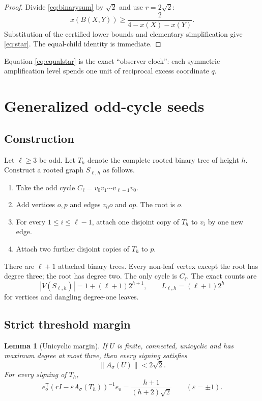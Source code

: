 \documentclass[11pt]{article}
\newtheorem{lemma}[theorem]{Lemma}
\newcommand{\eps}{\varepsilon}
\newcommand{\sgn}{\sigma}
\newcommand{\norm}[1]{\left\lVert #1\right\rVert}
\begin{document}
\begin{proof}
Divide \eqref{eq:binarysum} by $\sqrt2$ and use $r=2\sqrt2$:
\[
 x(B(X,Y))\ge\frac{2}{4-x(X)-x(Y)}.
\]
Substitution of the certified lower bounds and elementary simplification give \eqref{eq:star}.  The equal-child identity is immediate.
\end{proof}

Equation \eqref{eq:equalstar} is the exact ``observer clock'': each symmetric amplification level spends one unit of reciprocal excess coordinate $q$.

\section{Generalized odd-cycle seeds}

\subsection{Construction}

Let $\ell\ge3$ be odd.  Let $T_h$ denote the complete rooted binary tree of height $h$.  Construct a rooted graph $S_{\ell,h}$ as follows.

\begin{enumerate}[label=(\roman*)]
\item Take the odd cycle $C_\ell=v_0v_1\cdots v_{\ell-1}v_0$.
\item Add vertices $o,p$ and edges $v_0o$ and $op$.  The root is $o$.
\item For every $1\le i\le\ell-1$, attach one disjoint copy of $T_h$ to $v_i$ by one new edge.
\item Attach two further disjoint copies of $T_h$ to $p$.
\end{enumerate}

There are $\ell+1$ attached binary trees.  Every non-leaf vertex except the root has degree three; the root has degree two.  The only cycle is $C_\ell$.  The exact counts are
\begin{equation}\label{eq:seedcounts}
 |V(S_{\ell,h})|=1+(\ell+1)2^{h+1},
 \qquad
 L_{\ell,h}=(\ell+1)2^h
\end{equation}
for vertices and dangling degree-one leaves.

\subsection{Strict threshold margin}

\begin{lemma}[Unicyclic margin]\label{lem:unicycle}
If $U$ is finite, connected, unicyclic and has maximum degree at most three, then every signing satisfies
\[
 \norm{A_\sgn(U)}<2\sqrt2.
\]
For every signing of $T_h$,
\begin{equation}\label{eq:tree}
 e_o^{\mathsf T}(rI-\eps A_\sgn(T_h))^{-1}e_o
 =\frac{h+1}{(h+2)\sqrt2}
 \qquad (\eps=\pm1).
\end{equation}
\end{lemma}
\end{document}
